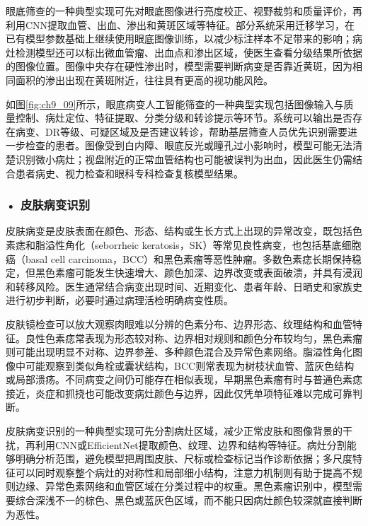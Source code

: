 眼底筛查的一种典型实现可先对眼底图像进行亮度校正、视野裁剪和质量评价，再利用CNN提取血管、出血、渗出和黄斑区域等特征。部分系统采用迁移学习，在已有模型参数基础上继续使用眼底图像训练，以减少标注样本不足带来的影响；病灶检测模型还可以标出微血管瘤、出血点和渗出区域，使医生查看分级结果所依据的图像位置。图像中央存在硬性渗出时，模型需要判断病变是否靠近黄斑，因为相同面积的渗出出现在黄斑附近，往往具有更高的视功能风险。

如图\ref{fig:ch9_09}所示，眼底病变人工智能筛查的一种典型实现包括图像输入与质量控制、病灶定位、特征提取、分类分级和转诊提示等环节。系统可以输出是否存在病变、DR等级、可疑区域及是否建议转诊，帮助基层筛查人员优先识别需要进一步检查的患者。图像受到白内障、眼底反光或瞳孔过小影响时，模型可能无法清楚识别微小病灶；视盘附近的正常血管结构也可能被误判为出血，因此医生仍需结合患者病史、视力检查和眼科专科检查复核模型结果。

\par
\noindent\begin{minipage}{\textwidth}
\centering
{}
\label{fig:ch9_09}
\end{minipage}
\par


\subsubsection*{\textbf{• 皮肤病变识别}}

皮肤病变是皮肤表面在颜色、形态、结构或生长方式上出现的异常改变，既包括色素痣和脂溢性角化（seborrheic keratosis，SK）等常见良性病变，也包括基底细胞癌（basal cell carcinoma，BCC）和黑色素瘤等恶性肿瘤。多数色素痣长期保持稳定，但黑色素瘤可能发生快速增大、颜色加深、边界改变或表面破溃，并具有浸润和转移风险。医生通常结合病变出现时间、近期变化、患者年龄、日晒史和家族史进行初步判断，必要时通过病理活检明确病变性质。

皮肤镜检查可以放大观察肉眼难以分辨的色素分布、边界形态、纹理结构和血管特征。良性色素痣常表现为形态较对称、边界相对规则和颜色分布较均匀，黑色素瘤则可能出现明显不对称、边界参差、多种颜色混合及异常色素网络。脂溢性角化图像中可能观察到类似角栓或囊状结构，BCC则常表现为树枝状血管、蓝灰色结构或局部溃疡。不同病变之间仍可能存在相似表现，早期黑色素瘤有时与普通色素痣接近，炎症和抓挠也可能改变病灶颜色与边界，因此仅凭单项特征难以完成可靠判断。

皮肤病变识别的一种典型实现可先分割病灶区域，减少正常皮肤和图像背景的干扰，再利用CNN或EfficientNet提取颜色、纹理、边界和结构等特征。病灶分割能够明确分析范围，避免模型把周围皮肤、尺标或检查标记当作诊断依据；多尺度特征可以同时观察整个病灶的对称性和局部细小结构，注意力机制则有助于提高不规则边缘、异常色素网络和血管区域在分类过程中的权重。黑色素瘤识别中，模型需要综合深浅不一的棕色、黑色或蓝灰色区域，而不能只因病灶颜色较深就直接判断为恶性。

